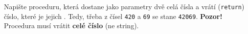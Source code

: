 \question[30]
Napište proceduru, která dostane jako parametry dvě celá čísla a vrátí
(\texttt{return}) číslo, které je jejich . Tedy, třeba z čísel
\texttt{420} a \texttt{69} se stane \texttt{42069}. \textbf{Pozor!} Procedura
musí vrátit \textbf{celé číslo} (ne string).\\